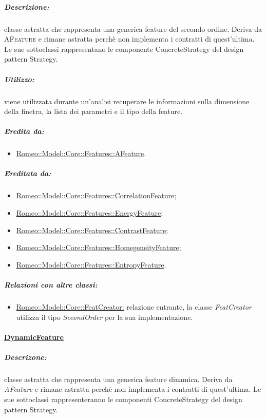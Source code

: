 			\subparagraph{Descrizione:} classe astratta che rappresenta una generica feature\g{} del secondo ordine. Deriva da \textsc{AFeature} e rimane astratta perchè non implementa i contratti di quest'ultima. Le sue sottoclassi rappresentano le componente ConcreteStrategy del design pattern\g{} Strategy.
			
			\subparagraph{Utilizzo:} viene utilizzata durante un’analisi recuperare le informazioni sulla dimensione della finetra, la lista dei parametri e il tipo della feature\g{}.
			
			\subparagraph{Eredita da:}
				\begin{itemize}
					\item \hyperref[features::features]{Romeo::Model::Core::Features::AFeature}.
				\end{itemize}
				
			\subparagraph{Ereditata da:}
				\begin{itemize}
					\item \hyperref[]{Romeo::Model::Core::Features::CorrelationFeature};
					\item \hyperref[]{Romeo::Model::Core::Features::EnergyFeature};
					\item \hyperref[]{Romeo::Model::Core::Features::ContrastFeature};
					\item \hyperref[]{Romeo::Model::Core::Features::HomegeneityFeature};
					\item \hyperref[]{Romeo::Model::Core::Features::EntropyFeature}.
				\end{itemize}
				
			\subparagraph{Relazioni con altre classi:}
						\begin{itemize}
							\item \hyperref[]{Romeo::Model::Core::FeatCreator:} relazione entrante, la classe \textsl{FeatCreator} utilizza il tipo \textsl{SecondOrder} per la sua implementazione. 
						\end{itemize}
			
		\paragraph{\underline{DynamicFeature}}
		\label{features::dynamic}
		
			\subparagraph{Descrizone:} classe astratta che rappresenta una generica feature\g{} dinamica. Deriva da \textsl{AFeature} e rimane astratta perchè non implementa i contratti di quest'ultima. Le sue sottoclassi rappresenteranno le componenti ConcreteStrategy del design pattern\g{} Strategy.
			

